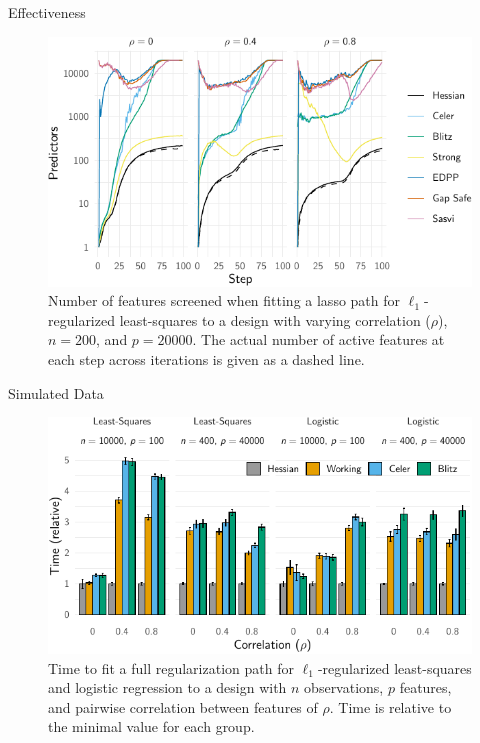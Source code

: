 \documentclass[10pt,ignorenonframetext]{beamer}
\begin{document}
\begin{frame}{Effectiveness}
  \begin{figure}
    \centering
    \includegraphics{figures/simulateddata-efficiency}
    \caption{
      Number of features screened 
      when fitting a lasso path for \(\ell_1\)-regularized
      least-squares to a design with varying correlation (\(\rho\)),
      \(n = 200\), and \(p = 20000\). The actual number of active
      features at each step across iterations is given as a dashed line.
    }
  \end{figure}
\end{frame}

\begin{frame}{Simulated Data}
  \begin{figure}
    \centering
    \includegraphics{figures/simulateddata-timings}
    \caption{Time to fit a full regularization path for
      \(\ell_1\)-regularized least-squares and logistic regression to
      a design with \(n\) observations, \(p\) features, and pairwise
      correlation between features of \(\rho\). Time is relative to the
      minimal value for each group.}
  \end{figure}
\end{frame}
\end{document}
